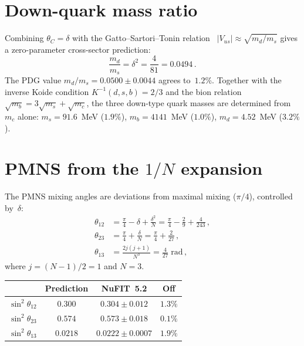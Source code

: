 \documentclass[aps,prl,twocolumn,showpacs,preprintnumbers]{revtex4-2}
\begin{document}

\section{Down-quark mass ratio}

Combining $\theta_C = \delta$ with the Gatto--Sartori--Tonin
relation~\cite{GST:1968} $|V_{us}| \approx \sqrt{m_d/m_s}$ gives
a zero-parameter cross-sector prediction:
\begin{equation}
  \frac{m_d}{m_s} = \delta^2 = \frac{4}{81} = 0.0494\,.
  \label{eq:md_ms}
\end{equation}
The PDG value $m_d/m_s = 0.0500 \pm 0.0044$ agrees to~$1.2\%$.
Together with the inverse Koide condition
$K^{-1}(d,s,b) = 2/3$ and the bion relation
$\sqrt{m_b} = 3\sqrt{m_s} + \sqrt{m_c}$,
the three down-type quark masses are determined from $m_c$ alone:
$m_s = 91.6$~MeV ($1.9\%$),
$m_b = 4141$~MeV ($1.0\%$),
$m_d = 4.52$~MeV ($3.2\%$).

\section{PMNS from the $1/N$ expansion}

The PMNS mixing angles are deviations from maximal mixing
($\pi/4$), controlled by~$\delta$:
\begin{align}
  \theta_{12} &= \frac{\pi}{4} - \delta + \frac{\delta^2}{N}
  = \frac{\pi}{4} - \frac{2}{9} + \frac{4}{243}\,,
  \label{eq:t12} \\
  \theta_{23} &= \frac{\pi}{4} + \frac{\delta}{N}
  = \frac{\pi}{4} + \frac{2}{27}\,,
  \label{eq:t23} \\
  \theta_{13} &= \frac{2j(j{+}1)}{N^3} = \frac{4}{27}\;\mathrm{rad}\,,
  \label{eq:t13}
\end{align}
where $j = (N{-}1)/2 = 1$ and $N = 3$.

\begin{center}
\begin{tabular}{lccc}
\hline
& Prediction & NuFIT~5.2 & Off \\
\hline
$\sin^2\theta_{12}$ & $0.300$ & $0.304 \pm 0.012$ & $1.3\%$ \\
$\sin^2\theta_{23}$ & $0.574$ & $0.573 \pm 0.018$ & $0.1\%$ \\
$\sin^2\theta_{13}$ & $0.0218$ & $0.0222 \pm 0.0007$ & $1.9\%$ \\
\hline
\end{tabular}
\end{center}
\end{document}
